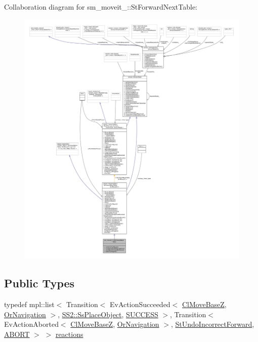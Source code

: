Collaboration diagram for sm\+\_\+moveit\+\_\+:\+:St\+Forward\+Next\+Table\+:
\nopagebreak
\begin{figure}[H]
\begin{center}
\leavevmode
\includegraphics[width=350pt]{structsm__moveit__3_1_1StForwardNextTable__coll__graph}
\end{center}
\end{figure}
\subsection*{Public Types}
\begin{DoxyCompactItemize}
\item 
typedef mpl\+::list$<$ Transition$<$ Ev\+Action\+Succeeded$<$ \hyperlink{classcl__move__base__z_1_1ClMoveBaseZ}{Cl\+Move\+BaseZ}, \hyperlink{classsm__moveit__3_1_1OrNavigation}{Or\+Navigation} $>$, \hyperlink{structsm__moveit__3_1_1SS2_1_1SsPlaceObject}{S\+S2\+::\+Ss\+Place\+Object}, \hyperlink{classSUCCESS}{S\+U\+C\+C\+E\+SS} $>$, Transition$<$ Ev\+Action\+Aborted$<$ \hyperlink{classcl__move__base__z_1_1ClMoveBaseZ}{Cl\+Move\+BaseZ}, \hyperlink{classsm__moveit__3_1_1OrNavigation}{Or\+Navigation} $>$, \hyperlink{structsm__moveit__3_1_1StUndoIncorrectForward}{St\+Undo\+Incorrect\+Forward}, \hyperlink{classABORT}{A\+B\+O\+RT} $>$ $>$ \hyperlink{structsm__moveit__3_1_1StForwardNextTable_a4ce04246a36fc8f0dbe1a817840c7f92}{reactions}
\end{DoxyCompactItemize}
